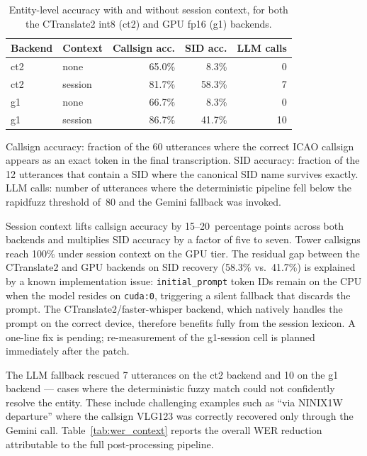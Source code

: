\begin{table}[htbp]
\caption{Entity-level accuracy with and without session context, for both the
CTranslate2 int8 (ct2) and GPU fp16 (g1) backends.}
\label{tab:entity_accuracy}
\centering
\begin{tabular}{llrrr}
\toprule
Backend & Context & Callsign acc. & SID acc. & LLM calls \\
\midrule
ct2 & none    & 65.0\% & 8.3\%  & 0  \\
ct2 & session & 81.7\% & 58.3\% & 7  \\
g1  & none    & 66.7\% & 8.3\%  & 0  \\
g1  & session & 86.7\% & 41.7\% & 10 \\
\bottomrule
\end{tabular}
\par\bigskip
\footnotesize Callsign accuracy: fraction of the 60 utterances where the correct ICAO callsign appears as an exact token in the final transcription. SID accuracy: fraction of the 12 utterances that contain a SID where the canonical SID name survives exactly. LLM calls: number of utterances where the deterministic pipeline fell below the rapidfuzz threshold of~80 and the Gemini fallback was invoked.
\end{table}

Session context lifts callsign accuracy by 15--20~percentage points across both
backends and multiplies SID accuracy by a factor of five to seven. Tower callsigns
reach 100\% under session context on the GPU tier. The residual gap between the
CTranslate2 and GPU backends on SID recovery (58.3\% vs.\ 41.7\%) is explained by
a known implementation issue: \texttt{initial\_prompt} token IDs remain on the CPU
when the model resides on \texttt{cuda:0}, triggering a silent fallback that
discards the prompt. The CTranslate2/faster-whisper backend, which natively
handles the prompt on the correct device, therefore benefits fully from the
session lexicon. A one-line fix is pending; re-measurement of the g1-session cell
is planned immediately after the patch.

The LLM fallback rescued 7 utterances on the ct2 backend and 10 on the g1 backend
— cases where the deterministic fuzzy match could not confidently resolve the
entity. These include challenging examples such as ``via NINIX1W departure''
where the callsign VLG123 was correctly recovered only through the Gemini call.
Table~\ref{tab:wer_context} reports the overall WER reduction attributable to the
full post-processing pipeline.

